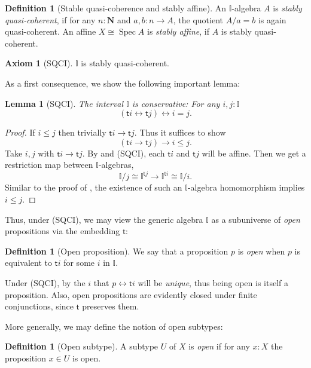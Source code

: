 \documentclass[12pt]{amsart}
\newtheorem{lemma}[theorem]{Lemma}
\theoremstyle{definition}
\newtheorem{definition}[theorem]{Definition}
\newtheorem*{axiom}{Axiom}
\newcommand{\mb}[1]{\mathbf{#1}}
\newcommand{\mbb}[1]{\mathbb{#1}}
\newcommand{\I}{\mbb I}
\newcommand{\ms}[1]{\mathsf{#1}}
\newcommand{\N}{\mb N}
\newcommand{\eq}{\leftrightarrow}
\newcommand{\spec}{\operatorname{Spec}}
\begin{document}
\begin{definition}[Stable quasi-coherence and stably affine]
  An $\I$-algebra $A$ is \emph{stably quasi-coherent}, if for any $n : \N$ and $a,b \colon n \to A$, the quotient $A/a=b$ is again quasi-coherent. An affine $X \cong \spec A$ is \emph{stably affine}, if $A$ is stably quasi-coherent.
\end{definition}

\begin{axiom}[SQCI]\label{ax:sqci}
  $\I$ is stably quasi-coherent.
\end{axiom}

As a first consequence, we show the following important lemma:

\begin{lemma}[SQCI]\label{lem:intconserve}
  The interval $\I$ is \emph{conservative}: For any $i,j : \I$
  \[ (\ms ti \eq \ms tj) \eq i = j. \]
\end{lemma}
\begin{proof}
  If $i \le j$ then trivially $\ms ti \to \ms tj$. Thus it suffices to show
  \[ (\ms ti \to \ms tj) \to i \le j. \]
  Take $i,j$ with $\ms ti \to \ms tj$. By  and (SQCI), each $\ms ti$ and $\ms tj$ will be affine. Then we get a restriction map between $\I$-algebras,
  \[ \I/j \cong \I^{\ms tj} \to \I^{\ms ti} \cong \I/i. \]
  Similar to the proof of , the existence of such an $\I$-algebra homomorphism implies $i \le j$. 
\end{proof}

Thus, under (SQCI), we may view the generic algebra $\I$ as a subuniverse of \emph{open} propositions via the embedding $\ms t$:

\begin{definition}[Open proposition]
  We say that a proposition $p$ is \emph{open} when $p$ is equivalent to $\ms ti$ for some $i$ in $\I$.
\end{definition}

Under (SQCI), by  the $i$ that $p \eq \ms ti$ will be \emph{unique}, thus being open is itself a proposition. Also, open propositions are evidently closed under finite conjunctions, since $\ms t$ preserves them. 

More generally, we may define the notion of open subtypes:

\begin{definition}[Open subtype]
  A subtype $U$ of $X$ is \emph{open} if for any $x:X$ the proposition $x\in U$ is open.
\end{definition}
\end{document}
